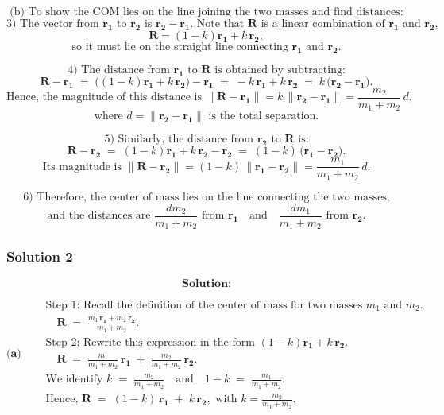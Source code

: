 \documentclass{article}
\begin{document}
\[
\text{(b) To show the COM lies on the line joining the two masses and find distances:}
\]
\[
\text{3) The vector from }\mathbf{r_1}\text{ to }\mathbf{r_2}\text{ is } \mathbf{r_2} - \mathbf{r_1}.
\text{ Note that }
\mathbf{R}
\text{ is a linear combination of }
\mathbf{r_1}
\text{ and }
\mathbf{r_2},
\]
\[
\mathbf{R} = (1-k)\mathbf{r_1} + k\,\mathbf{r_2},
\]
\[
\text{so it must lie on the straight line connecting }\mathbf{r_1}\text{ and }\mathbf{r_2}.
\]

\[
\text{4) The distance from } \mathbf{r_1} \text{ to } \mathbf{R} \text{ is obtained by subtracting:}
\]
\[
\mathbf{R} - \mathbf{r_1} \;=\; \bigl((1-k)\mathbf{r_1} + k\,\mathbf{r_2}\bigr) - \mathbf{r_1}
\;=\; -k\,\mathbf{r_1} + k\,\mathbf{r_2}
\;=\; k\,\bigl(\mathbf{r_2} - \mathbf{r_1}\bigr).
\]
\[
\text{Hence, the magnitude of this distance is }
\|\mathbf{R} - \mathbf{r_1}\|
= k \,\|\mathbf{r_2} - \mathbf{r_1}\|
= \frac{m_2}{m_1 + m_2}\, d,
\]
\[
\text{where } d = \|\mathbf{r_2} - \mathbf{r_1}\|\text{ is the total separation.}
\]

\[
\text{5) Similarly, the distance from } \mathbf{r_2} \text{ to } \mathbf{R} \text{ is:}
\]
\[
\mathbf{R} - \mathbf{r_2} 
\;=\; (1-k)\mathbf{r_1} + k\,\mathbf{r_2} - \mathbf{r_2}
\;=\; (1-k)\,\bigl(\mathbf{r_1} - \mathbf{r_2}\bigr).
\]
\[
\text{Its magnitude is }
\|\mathbf{R} - \mathbf{r_2}\|
= (1-k)\,\|\mathbf{r_1} - \mathbf{r_2}\|
= \frac{m_1}{m_1 + m_2}\, d.
\]

\[
\text{6) Therefore, the center of mass lies on the line connecting the two masses,}
\]
\[
\text{and the distances are }
\frac{dm_2}{m_1 + m_2} \text{ from } \mathbf{r_1}
\quad\text{and}\quad
\frac{dm_1}{m_1 + m_2} \text{ from } \mathbf{r_2}.
\]

\subsubsection{Solution 2}
\[
\textbf{Solution:}
\]

\[
\textbf{(a)}\quad
\begin{aligned}
&\text{Step 1: Recall the definition of the center of mass for two masses }m_1\text{ and }m_2\text{.}\\
&\quad \mathbf{R} \;=\;\frac{m_1 \,\mathbf{r_1} + m_2 \,\mathbf{r_2}}{m_1 + m_2}.\\[6pt]
&\text{Step 2: Rewrite this expression in the form }(1-k)\mathbf{r_1} + k\,\mathbf{r_2}.\\
&\quad \mathbf{R} \;=\;\frac{m_1}{m_1 + m_2}\,\mathbf{r_1} \;+\;\frac{m_2}{m_1 + m_2}\,\mathbf{r_2}.\\[6pt]
&\text{We identify }
k \;=\;\frac{m_2}{m_1 + m_2}
\quad\text{and}\quad
1-k \;=\;\frac{m_1}{m_1 + m_2}.
\\
&\text{Hence, }
\mathbf{R} \;=\;(1-k)\,\mathbf{r_1} \;+\;k\,\mathbf{r_2},
\text{ with }
k=\frac{m_2}{m_1 + m_2}.
\end{aligned}
\]
\end{document}
